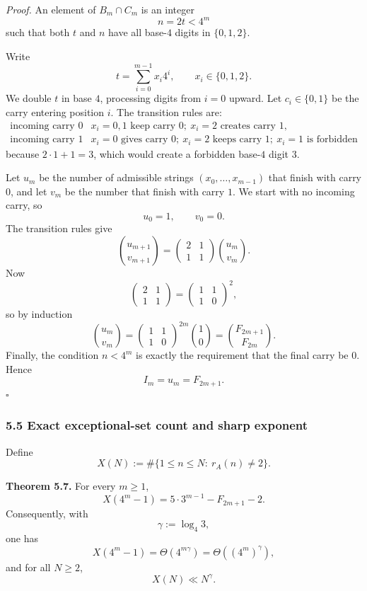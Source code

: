 \medskip
\noindent
\emph{Proof.}
An element of \(B_m\cap C_m\) is an integer
\[
n=2t<4^m
\]
such that both \(t\) and \(n\) have all base-\(4\) digits in \(\{0,1,2\}\).

Write
\[
t=\sum_{i=0}^{m-1} x_i4^i,\qquad x_i\in\{0,1,2\}.
\]
We double \(t\) in base \(4\), processing digits from \(i=0\) upward. Let \(c_i\in\{0,1\}\) be the carry entering position \(i\). The transition rules are:
\[
\begin{array}{c|c}
\text{incoming carry }0 & x_i=0,1 \text{ keep carry }0;\ x_i=2 \text{ creates carry }1,\\
\hline
\text{incoming carry }1 & x_i=0 \text{ gives carry }0;\ x_i=2 \text{ keeps carry }1;\ x_i=1 \text{ is forbidden}
\end{array}
\]
because \(2\cdot 1+1=3\), which would create a forbidden base-\(4\) digit \(3\).

Let \(u_m\) be the number of admissible strings \((x_0,\dots,x_{m-1})\) that finish with carry \(0\), and let \(v_m\) be the number that finish with carry \(1\). We start with no incoming carry, so
\[
u_0=1,\qquad v_0=0.
\]
The transition rules give
\[
\binom{u_{m+1}}{v_{m+1}}
=
\begin{pmatrix}
2 & 1\\
1 & 1
\end{pmatrix}
\binom{u_m}{v_m}.
\]
Now
\[
\begin{pmatrix}
2 & 1\\
1 & 1
\end{pmatrix}
=
\begin{pmatrix}
1 & 1\\
1 & 0
\end{pmatrix}^{\!2},
\]
so by induction
\[
\binom{u_m}{v_m}
=
\begin{pmatrix}
1 & 1\\
1 & 0
\end{pmatrix}^{\!2m}
\binom{1}{0}
=
\binom{F_{2m+1}}{F_{2m}}.
\]
Finally, the condition \(n<4^m\) is exactly the requirement that the final carry be \(0\). Hence
\[
I_m=u_m=F_{2m+1}.
\]
\hfill\(\square\)

\subsubsection*{5.5 Exact exceptional-set count and sharp exponent}
Define
\[
X(N):=\#\{1\le n\le N:\ r_A(n)\ne 2\}.
\]

\medskip
\noindent
\textbf{Theorem 5.7.}
For every \(m\ge 1\),
\begin{equation}\label{eq:exact-exceptional}
X(4^m-1)=5\cdot 3^{m-1}-F_{2m+1}-2.
\end{equation}
Consequently, with
\[
\gamma:=\log_4 3,
\]
one has
\[
X(4^m-1)=\Theta(4^{m\gamma})=\Theta((4^m)^\gamma),
\]
and for all \(N\ge 2\),
\[
X(N)\ll N^\gamma.
\]

